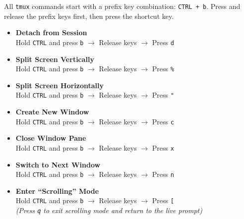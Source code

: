 \documentclass[
  letterpaper,
]{scrbook}
\providecommand{\tightlist}{%
  \setlength{\itemsep}{0pt}\setlength{\parskip}{0pt}}
\begin{document}
\begin{tcolorbox}[enhanced jigsaw, left=2mm, toptitle=1mm, breakable, opacitybacktitle=0.6, title=\textcolor{quarto-callout-tip-color}{\faLightbulb}\hspace{0.5em}{Essential tmux Shortcuts}, colback=white, opacityback=0, rightrule=.15mm, leftrule=.75mm, colbacktitle=quarto-callout-tip-color!10!white, bottomtitle=1mm, titlerule=0mm, coltitle=black, colframe=quarto-callout-tip-color-frame, arc=.35mm, bottomrule=.15mm, toprule=.15mm]

All \texttt{tmux} commands start with a prefix key combination:
\texttt{CTRL\ +\ b}. Press and release the prefix keys first, then press
the shortcut key.

\begin{itemize}
\tightlist
\item
  \textbf{Detach from Session}\\
  Hold \texttt{CTRL} and press \texttt{b} \(\rightarrow\) Release keys
  \(\rightarrow\) Press \texttt{d}
\item
  \textbf{Split Screen Vertically}\\
  Hold \texttt{CTRL} and press \texttt{b} \(\rightarrow\) Release keys
  \(\rightarrow\) Press \texttt{\%}
\item
  \textbf{Split Screen Horizontally}\\
  Hold \texttt{CTRL} and press \texttt{b} \(\rightarrow\) Release keys
  \(\rightarrow\) Press \texttt{"}
\item
  \textbf{Create New Window}\\
  Hold \texttt{CTRL} and press \texttt{b} \(\rightarrow\) Release keys
  \(\rightarrow\) Press \texttt{c}
\item
  \textbf{Close Window Pane}\\
  Hold \texttt{CTRL} and press \texttt{b} \(\rightarrow\) Release keys
  \(\rightarrow\) Press \texttt{x}
\item
  \textbf{Switch to Next Window}\\
  Hold \texttt{CTRL} and press \texttt{b} \(\rightarrow\) Release keys
  \(\rightarrow\) Press \texttt{n}
\item
  \textbf{Enter ``Scrolling'' Mode}\\
  Hold \texttt{CTRL} and press \texttt{b} \(\rightarrow\) Release keys
  \(\rightarrow\) Press \texttt{{[}}\\
  \emph{(Press \texttt{q} to exit scrolling mode and return to the live
  prompt)}
\end{itemize}

\end{tcolorbox}
\end{document}
